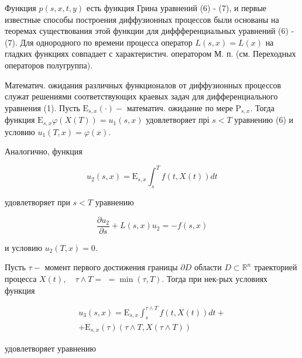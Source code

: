 \documentclass[10pt]{article}
\begin{document}
Функция $p(s, x, t, y)$ есть функция Грина уравнений (6) - (7), и первые известные способы построения диффузионных процессов были основаны на теоремах существования этой функции для диффференциальных уравнений (6) - (7). Для однородного по времени процесса оператор $L(s, x)=L(x)$ на гладких функциях совпадает с характеристич. оператором М. п. (см. Переходных операторов полугруппа).



Математич. ожидания различных функционалов от диффузионных процессов служат решениями соответствующих краевых задач для дифференциального уравнения (1). Пусть $\mathrm{E}_{s, x}(\cdot)-$ математич. ожидание по мере $\mathrm{P}_{s, x}$. Тогда функция $\mathrm{E}_{s, x} \varphi(X(T))=u_{1}(s, x)$ удовлетворяет прі $s<T$ уравнению (6) и условию $u_{1}(T, x)=\varphi(x)$.



Аналогично, функция



\[

u_{2}(s, x)=\mathrm{E}_{s, x} \int_{s}^{T} f(t, X(t)) d t

\]



удовлетворяет при $s<T$ уравнению



\[

\frac{\partial u_{2}}{\partial s}+L(s, x) u_{2}=-f(s, x)

\]



и условию $u_{2}(T, x)=0$.



Пусть $\tau-$ момент первого достижения границы $\partial D$ области $D \subset \mathbb{R}^{n}$ траекторией процесса $X(t), \quad \tau \wedge T=$ $=\min (\tau, T)$. Тогда при нек-рых условиях функция



\[

\begin{gathered}

u_{3}(s, x)=\mathrm{E}_{s, x} \int_{s}^{\tau \wedge T} f(t, X(t)) d t+ \\

+\mathrm{E}_{s, x}(\tau)(\tau \wedge T, X(\tau \wedge T))

\end{gathered}

\]



удовлетворяет уравнению
\end{document}
